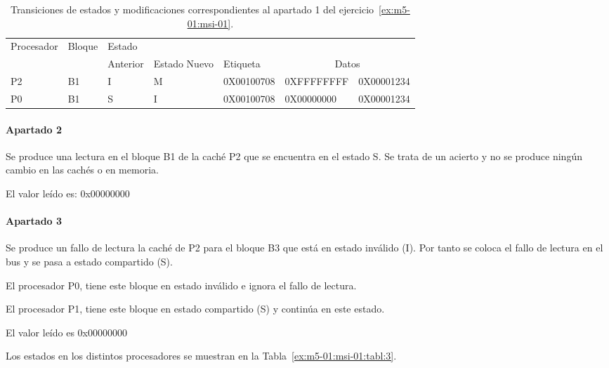 \begin{table}[htbp]

\begin{tabular}{|l|l|l|l|l|l|l|}

\hline
Procesador 	& Bloque 	& Estado 	& 		&  		& \multicolumn{2}{c|}{}\\
		&		& Anterior	& Estado Nuevo	& Etiqueta	& \multicolumn{2}{c|}{Datos}\\
\hline
\hline
P2 & B1 & I & M & 0X00100708 & 0XFFFFFFFF & 0X00001234\\
\hline
P0 & B1 & S & I & 0X00100708 & 0X00000000 & 0X00001234\\
\hline

\end{tabular}

\caption{Transiciones de estados y modificaciones correspondientes al apartado 1 del ejercicio~\ref{ex:m5-01:msi-01}.}
\label{ex:m5-01:msi-01:tabl:2}
\end{table}

\paragraph{Apartado 2}

Se produce una lectura en el bloque B1 de la caché P2 que se encuentra en el
estado S. Se trata de un acierto y no se produce ningún cambio en las cachés o
en memoria.

El valor leído es: 0x00000000

\paragraph{Apartado 3}

Se produce un fallo de lectura la caché de P2 para el bloque B3 que está en
estado inválido (I). Por tanto se coloca el fallo de lectura en el bus y se
pasa a estado compartido (S).

El procesador P0, tiene este bloque en estado inválido e ignora el fallo de lectura.

El procesador P1, tiene este bloque en estado compartido (S) y continúa en este estado.

El valor leído es 0x00000000

Los estados en los distintos procesadores se muestran en la Tabla~\ref{ex:m5-01:msi-01:tabl:3}.

